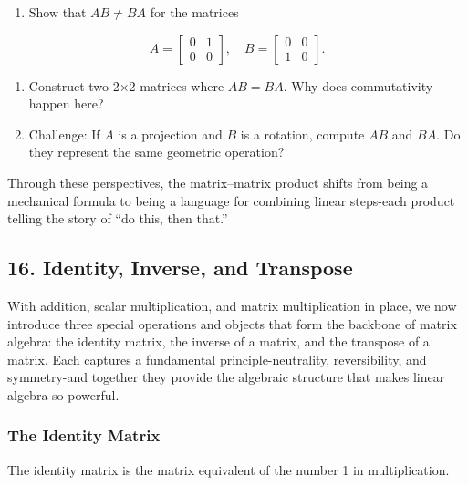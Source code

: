 \documentclass[
  letterpaper,
  DIV=11,
  numbers=noendperiod]{scrreprt}
\providecommand{\tightlist}{%
  \setlength{\itemsep}{0pt}\setlength{\parskip}{0pt}}
\begin{document}
\begin{enumerate}
\def\labelenumi{\arabic{enumi}.}
\setcounter{enumi}{1}
\tightlist
\item
  Show that \(AB \neq BA\) for the matrices
\end{enumerate}

\[
A = \begin{bmatrix} 0 & 1 \\ 0 & 0 \end{bmatrix}, 
\quad 
B = \begin{bmatrix} 0 & 0 \\ 1 & 0 \end{bmatrix}.
\]

\begin{enumerate}
\def\labelenumi{\arabic{enumi}.}
\setcounter{enumi}{2}
\item
  Construct two 2×2 matrices where \(AB = BA\). Why does commutativity
  happen here?
\item
  Challenge: If \(A\) is a projection and \(B\) is a rotation, compute
  \(AB\) and \(BA\). Do they represent the same geometric operation?
\end{enumerate}

Through these perspectives, the matrix--matrix product shifts from being
a mechanical formula to being a language for combining linear steps-each
product telling the story of ``do this, then that.''

\subsection{16. Identity, Inverse, and
Transpose}\label{identity-inverse-and-transpose}

With addition, scalar multiplication, and matrix multiplication in
place, we now introduce three special operations and objects that form
the backbone of matrix algebra: the identity matrix, the inverse of a
matrix, and the transpose of a matrix. Each captures a fundamental
principle-neutrality, reversibility, and symmetry-and together they
provide the algebraic structure that makes linear algebra so powerful.

\subsubsection{The Identity Matrix}\label{the-identity-matrix}

The identity matrix is the matrix equivalent of the number 1 in
multiplication.
\end{document}
